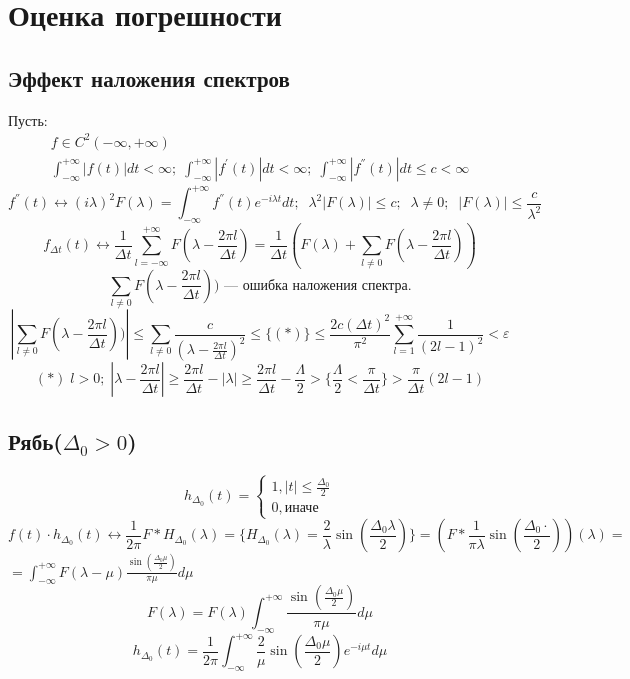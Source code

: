 \section{Оценка погрешности}
\subsection{Эффект наложения спектров}
Пусть: 
\begin{multline}
f \in C^2(-\infty, +\infty)\\
\int_{-\infty}^{+\infty} |f(t)|dt < \infty;\;\int_{-\infty}^{+\infty} |f^{'}(t)|dt < \infty;\;\int_{-\infty}^{+\infty} |f^{''}(t)|dt \leq c < \infty
\end{multline}
\[f^{''}(t) \leftrightarrow (i\lambda)^2F(\lambda) = \int_{-\infty}^{+\infty} f^{''}(t)e^{-i\lambda t}dt;\;\;\lambda^2|F(\lambda)| \leq c;\;\; \lambda \neq 0;\;\; |F(\lambda)| \leq \frac{c}{\lambda^2}\]
\[f_{\Delta t}(t) \leftrightarrow \frac{1}{\Delta t}\sum_{l = -\infty}^{+\infty} F(\lambda - \frac{2\pi l}{\Delta t}) = \frac{1}{\Delta t}(F(\lambda) + \sum_{l \neq 0} F(\lambda - \frac{2\pi l}{\Delta t}))\]
\[\sum_{l \neq 0} F(\lambda - \frac{2\pi l}{\Delta t})) \texttt{ --- ошибка наложения спектра.}\]
\[|\sum_{l \neq 0} F(\lambda - \frac{2\pi l}{\Delta t}))| \leq \sum_{l \neq 0} \frac{c}{(\lambda - \frac{2\pi l}{\Delta t})^2} \leq \{(*)\} \leq \frac{2c(\Delta t)^2}{\pi^2} \sum_{l = 1}^{+\infty} \frac{1}{(2l - 1)^2} < \varepsilon\]
\[(*) \; l > 0;\; |\lambda - \frac{2\pi l}{\Delta t}| \geq \frac{2\pi l}{\Delta t} - |\lambda| \geq \frac{2\pi l}{\Delta t} - \frac{\Lambda}{2} > \{\frac{\Lambda}{2} < \frac{\pi}{\Delta t}\} > \frac{\pi}{\Delta t}(2l - 1)\]
\subsection{Рябь($\Delta_0 > 0$)}
\begin{equation*}
h_{\Delta_0}(t) = 
 \begin{cases}
   1, |t| \leq \frac{\Delta_0}{2}\\
   0, \texttt{иначе}
 \end{cases}
\end{equation*}
\[f(t)\cdot h_{\Delta_0}(t) \leftrightarrow \frac{1}{2\pi}F*H_{\Delta_0}(\lambda) = \{H_{\Delta_0}(\lambda) = \frac{2}{\lambda}\sin(\frac{\Delta_0\lambda}{2})\} = (F*\frac{1}{\pi\lambda}\sin(\frac{\Delta_0\cdot}{2}))(\lambda) = \]
\(= \int_{-\infty}^{+\infty} F(\lambda - \mu)\frac{\sin(\frac{\Delta_0\mu}{2})}{\pi\mu}d\mu\)
\[F(\lambda) = F(\lambda)\int_{-\infty}^{+\infty} \frac{\sin(\frac{\Delta_0\mu}{2})}{\pi\mu}d\mu\]
\[h_{\Delta_0}(t) = \frac{1}{2\pi}\int_{-\infty}^{+\infty} \frac{2}{\mu}\sin(\frac{\Delta_0\mu}{2})e^{-i\mu t}d\mu\]
